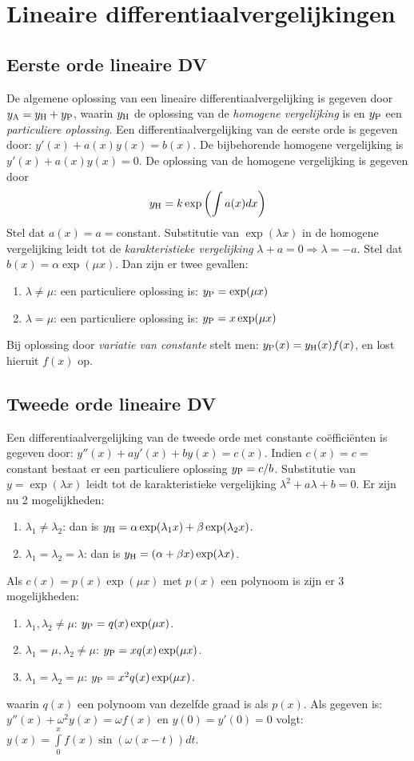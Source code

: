 \documentclass[twoside]{report}
\begin{document}
\section{Lineaire differentiaalvergelijkingen}
\subsection{Eerste orde lineaire DV}
De algemene oplossing van een lineaire differentiaalvergelijking is
gegeven door $y_{\rm A}=y_{\rm H}+y_{\rm P}$, waarin $y_{\rm H}$ de oplossing
van de {\it homogene vergelijking} is en $y_{\rm P}$ een {\it particuliere
oplossing}.
\npar
Een differentiaalvergelijking van de eerste orde is gegeven door:
$y'(x)+a(x)y(x)=b(x)$. De bijbehorende homogene vergelijking is
$y'(x)+a(x)y(x)=0$.
\npar
De oplossing van de homogene vergelijking is gegeven door
\[
y_{\rm H}=k\exp\left(\int a(x)dx\right)
\]
Stel dat $a(x)=a=$constant.
\npar
Substitutie van $\exp(\lambda x)$ in de homogene vergelijking leidt tot de
{\it karakteristieke vergelijking} $\lambda+a=0\Rightarrow \lambda=-a$.
\npar
Stel dat $b(x)=\alpha\exp(\mu x)$. Dan zijn er twee gevallen:
\begin{enumerate}
\item $\lambda\neq\mu$: een particuliere oplossing is: $y_{\rm P}=\exp(\mu x)$
\item $\lambda=\mu$: een particuliere oplossing is: $y_{\rm P}=x\exp(\mu x)$
\end{enumerate}
\npar
Bij oplossing door {\it variatie van constante} stelt men:
$y_{\rm P}(x)=y_{\rm H}(x)f(x)$, en lost hieruit $f(x)$ op.

\subsection{Tweede orde lineaire DV}
Een differentiaalvergelijking van de tweede orde met constante
co\"effici\"enten is gegeven door: $y''(x)+ay'(x)+by(x)=c(x)$. Indien
$c(x)=c=$constant bestaat er een particuliere oplossing $y_{\rm P}=c/b$.
\npar
Substitutie van $y=\exp(\lambda x)$ leidt tot de karakteristieke vergelijking
$\lambda^2+a\lambda+b=0$.
\npar
Er zijn nu 2 mogelijkheden:
\begin{enumerate}
\item $\lambda_1\neq\lambda_2$: dan is $y_{\rm H}=\alpha\exp(\lambda_1 x)+\beta\exp(\lambda_2 x)$.
\item $\lambda_1=\lambda_2=\lambda$: dan is $y_{\rm H}=(\alpha +\beta x)\exp(\lambda x)$.
\end{enumerate}
\npar
Als $c(x)=p(x)\exp(\mu x)$ met $p(x)$ een polynoom is zijn er 3 mogelijkheden:
\begin{enumerate}
\item $\lambda_1,\lambda_2\neq\mu$: $y_{\rm P}=q(x)\exp(\mu x)$.
\item $\lambda_1=\mu,\lambda_2\neq\mu$: $y_{\rm P}=xq(x)\exp(\mu x)$.
\item $\lambda_1=\lambda_2=\mu$: $y_{\rm P}=x^2q(x)\exp(\mu x)$.
\end{enumerate}
waarin $q(x)$ een polynoom van dezelfde graad is als $p(x)$.
\npar
Als gegeven is: $y''(x)+\omega^2y(x)=\omega f(x)$ en $y(0)=y'(0)=0$ volgt:
$y(x)=\int\limits_0^xf(x)\sin(\omega(x-t))dt$.
\end{document}
